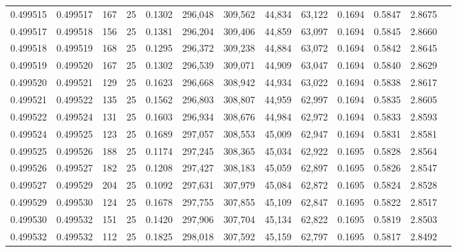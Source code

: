 \begin{tabular}{rrrrrrrrrrrrr}
0.499515 & 0.499517 & 167 &  25 &                                     0.1302 & 296,048 & 309,562 &  44,834 &  63,122 & 0.1694 & 0.5847 & 2.8675 \\
0.499517 & 0.499518 & 156 &  25 &                                     0.1381 & 296,204 & 309,406 &  44,859 &  63,097 & 0.1694 & 0.5845 & 2.8660 \\
0.499518 & 0.499519 & 168 &  25 &                                     0.1295 & 296,372 & 309,238 &  44,884 &  63,072 & 0.1694 & 0.5842 & 2.8645 \\
0.499519 & 0.499520 & 167 &  25 &                                     0.1302 & 296,539 & 309,071 &  44,909 &  63,047 & 0.1694 & 0.5840 & 2.8629 \\
0.499520 & 0.499521 & 129 &  25 &                                     0.1623 & 296,668 & 308,942 &  44,934 &  63,022 & 0.1694 & 0.5838 & 2.8617 \\
0.499521 & 0.499522 & 135 &  25 &                                     0.1562 & 296,803 & 308,807 &  44,959 &  62,997 & 0.1694 & 0.5835 & 2.8605 \\
0.499522 & 0.499524 & 131 &  25 &                                     0.1603 & 296,934 & 308,676 &  44,984 &  62,972 & 0.1694 & 0.5833 & 2.8593 \\
0.499524 & 0.499525 & 123 &  25 &                                     0.1689 & 297,057 & 308,553 &  45,009 &  62,947 & 0.1694 & 0.5831 & 2.8581 \\
0.499525 & 0.499526 & 188 &  25 &                                     0.1174 & 297,245 & 308,365 &  45,034 &  62,922 & 0.1695 & 0.5828 & 2.8564 \\
0.499526 & 0.499527 & 182 &  25 &                                     0.1208 & 297,427 & 308,183 &  45,059 &  62,897 & 0.1695 & 0.5826 & 2.8547 \\
0.499527 & 0.499529 & 204 &  25 &                                     0.1092 & 297,631 & 307,979 &  45,084 &  62,872 & 0.1695 & 0.5824 & 2.8528 \\
0.499529 & 0.499530 & 124 &  25 &                                     0.1678 & 297,755 & 307,855 &  45,109 &  62,847 & 0.1695 & 0.5822 & 2.8517 \\
0.499530 & 0.499532 & 151 &  25 &                                     0.1420 & 297,906 & 307,704 &  45,134 &  62,822 & 0.1695 & 0.5819 & 2.8503 \\
0.499532 & 0.499532 & 112 &  25 &                                     0.1825 & 298,018 & 307,592 &  45,159 &  62,797 & 0.1695 & 0.5817 & 2.8492 \\

\end{tabular}
